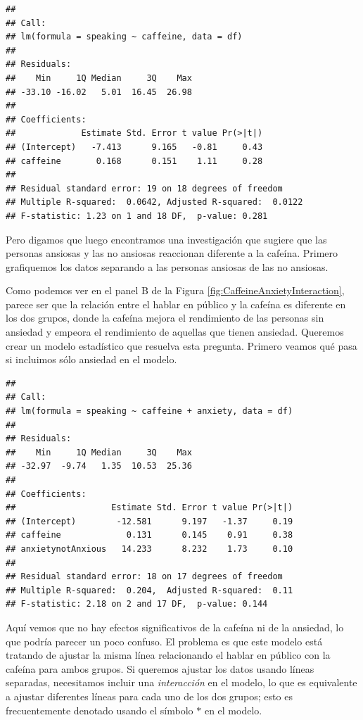 \documentclass[
  12pt,
]{book}
\theoremstyle{definition}
\theoremstyle{definition}
\theoremstyle{definition}
\theoremstyle{remark}
\begin{document}
\begin{verbatim}
## 
## Call:
## lm(formula = speaking ~ caffeine, data = df)
## 
## Residuals:
##    Min     1Q Median     3Q    Max 
## -33.10 -16.02   5.01  16.45  26.98 
## 
## Coefficients:
##             Estimate Std. Error t value Pr(>|t|)
## (Intercept)   -7.413      9.165   -0.81     0.43
## caffeine       0.168      0.151    1.11     0.28
## 
## Residual standard error: 19 on 18 degrees of freedom
## Multiple R-squared:  0.0642,	Adjusted R-squared:  0.0122 
## F-statistic: 1.23 on 1 and 18 DF,  p-value: 0.281
\end{verbatim}

Pero digamos que luego encontramos una investigación que sugiere que las personas ansiosas y las no ansiosas reaccionan diferente a la cafeína. Primero grafiquemos los datos separando a las personas ansiosas de las no ansiosas.

Como podemos ver en el panel B de la Figura \ref{fig:CaffeineAnxietyInteraction}, parece ser que la relación entre el hablar en público y la cafeína es diferente en los dos grupos, donde la cafeína mejora el rendimiento de las personas sin ansiedad y empeora el rendimiento de aquellas que tienen ansiedad. Queremos crear un modelo estadístico que resuelva esta pregunta. Primero veamos qué pasa si incluimos sólo ansiedad en el modelo.

\begin{verbatim}
## 
## Call:
## lm(formula = speaking ~ caffeine + anxiety, data = df)
## 
## Residuals:
##    Min     1Q Median     3Q    Max 
## -32.97  -9.74   1.35  10.53  25.36 
## 
## Coefficients:
##                   Estimate Std. Error t value Pr(>|t|)
## (Intercept)        -12.581      9.197   -1.37     0.19
## caffeine             0.131      0.145    0.91     0.38
## anxietynotAnxious   14.233      8.232    1.73     0.10
## 
## Residual standard error: 18 on 17 degrees of freedom
## Multiple R-squared:  0.204,	Adjusted R-squared:  0.11 
## F-statistic: 2.18 on 2 and 17 DF,  p-value: 0.144
\end{verbatim}

Aquí vemos que no hay efectos significativos de la cafeína ni de la ansiedad, lo que podría parecer un poco confuso. El problema es que este modelo está tratando de ajustar la misma línea relacionando el hablar en público con la cafeína para ambos grupos. Si queremos ajustar los datos usando líneas separadas, necesitamos incluir una \emph{interacción} en el modelo, lo que es equivalente a ajustar diferentes líneas para cada uno de los dos grupos; esto es frecuentemente denotado usando el símbolo \(*\) en el modelo.
\end{document}
